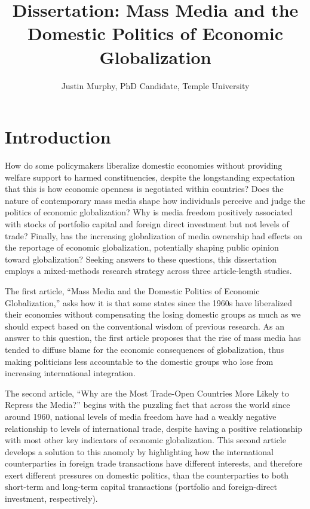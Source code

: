 \documentclass[12pt]{report}
\begin{document}
\title{Dissertation: Mass Media and the Domestic Politics of Economic Globalization}
\author{Justin Murphy, PhD Candidate, Temple University}

\maketitle



\doublespacing

\chapter{Introduction}

How do some policymakers liberalize domestic economies without providing welfare support to harmed constituencies, despite the longstanding expectation that this is how economic openness is negotiated within countries? Does the nature of contemporary mass media shape how individuals perceive and judge the politics of economic globalization?  Why is media freedom positively associated with stocks of portfolio capital and foreign direct investment but not levels of trade? Finally, has the increasing globalization of media ownership had effects on the reportage of economic globalization, potentially shaping public opinion toward globalization? Seeking answers to these questions, this dissertation employs a mixed-methods research strategy across three article-length studies.

The first article, ``Mass Media and the Domestic Politics of Economic Globalization,'' asks how it is that some states since the 1960s have liberalized their economies without compensating the losing domestic groups as much as we should expect based on the conventional wisdom of previous research. As an answer to this question, the first article proposes that the rise of mass media has tended to diffuse blame for the economic consequences of globalization, thus making politicians less accountable to the domestic groups who lose from increasing international integration.

The second article, ``Why are the Most Trade-Open Countries More Likely to Repress the Media?'' begins with the puzzling fact that across the world since around 1960, national levels of media freedom have had a weakly negative relationship to levels of international trade, despite having a positive relationship with most other key indicators of economic globalization. This second article develops a solution to this anomoly by highlighting how the international counterparties in foreign trade transactions have different interests, and therefore exert different pressures on domestic politics, than the counterparties to both short-term and long-term capital transactions (portfolio and foreign-direct investment, respectively).
\end{document}
